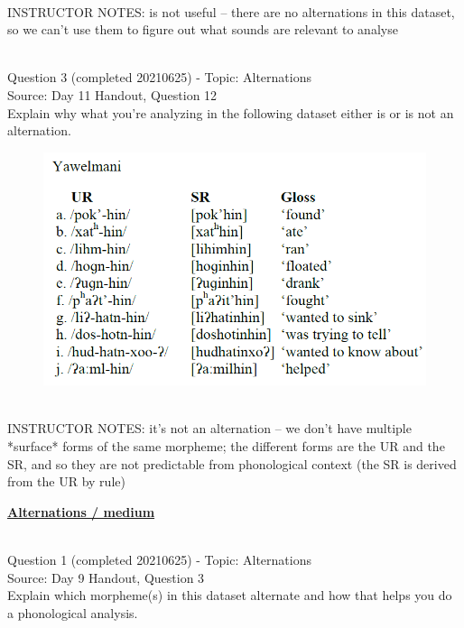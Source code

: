 \documentclass[12pt]{article}
\begin{document}
~\\
INSTRUCTOR NOTES: is not useful -- there are no alternations in this dataset, so we can't use them to figure out what sounds are relevant to analyse


~\\

{\large Question 3} (completed 20210625) - Topic: Alternations\\
Source: Day 11 Handout, Question 12\\

Explain why what you’re analyzing in the following dataset either is or is not an alternation.\\

\begin{figure}[H]
\includegraphics{../images/yawelmani.png}
\end{figure}

~\\
INSTRUCTOR NOTES: it's not an alternation -- we don't have multiple *surface* forms of the same morpheme; the different forms are the UR and the SR, and so they are not predictable from phonological context (the SR is derived from the UR by rule)


\newpage\textbf{\underline{\huge Alternations / medium\\}}

~\\

{\large Question 1} (completed 20210625) - Topic: Alternations\\
Source: Day 9 Handout, Question 3\\

Explain which morpheme(s) in this dataset alternate and how that helps you do a phonological analysis.\\
\end{document}
